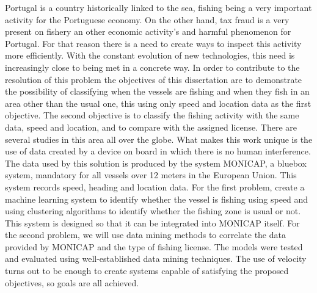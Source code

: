 \abstractEN %

Portugal is a country historically linked to the sea, fishing being a very important activity for the Portuguese economy. On the other hand, tax fraud is a very present on fishery an other economic activity's and harmful phenomenon for Portugal. For that reason there is a need to create ways to inspect this activity more efficiently. With the constant evolution of new technologies, this need is increasingly close to being met in a concrete way.
In order to contribute to the resolution of this problem the objectives of this dissertation are to demonstrate the possibility of classifying when the vessels are fishing and when they fish in an area other than the usual one, this using only speed and location data as the first objective. The second objective is to classify the fishing activity with the same data, speed and location, and to compare with the assigned license.
There are several studies in this area all over the globe. What makes this work unique is the use of data created by a device on board in which there is no human interference. %
The data used by this solution is produced by the system MONICAP, a bluebox system, mandatory for all vessels over 12 meters in the European Union. This system records speed, heading and location data.
For the first problem, create a machine learning system to identify whether
the vessel is fishing using speed and using clustering algorithms to identify whether
the fishing zone is usual or not. This system is designed so that it can be integrated into MONICAP itself. For the second problem, we will use data mining
methods to correlate the data provided by MONICAP and the type of fishing
license.
The models were tested and evaluated using well-established data mining techniques.
The use of velocity turns out to be enough to create systems capable of satisfying
the proposed objectives, so goals are all achieved.





